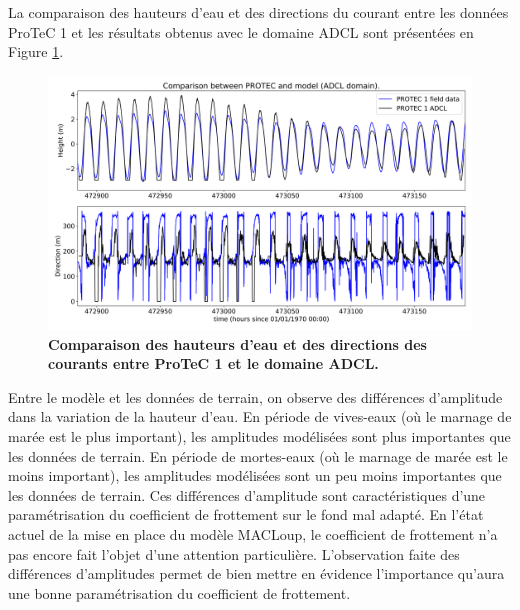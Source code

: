 \documentclass[10pt,a4paper,titlepage]{article}
\begin{document}


La comparaison des hauteurs d'eau et des directions du courant entre les données ProTeC 1 et les résultats obtenus avec le domaine ADCL sont présentées en Figure \ref{fig:comp_brute_ADCL_PROTEC}.

\begin{figure}[h!]
	\centering
	\includegraphics[scale=0.35]{../images/post_traitement/Speed_ADCL_PROTEC1.png}
	\caption{
		\textbf{Comparaison des hauteurs d'eau et des directions des courants entre ProTeC 1 et le domaine ADCL.}}
	\label{fig:comp_brute_ADCL_PROTEC}
\end{figure}

Entre le modèle et les données de terrain, on observe des différences d'amplitude dans la variation de la hauteur d'eau.
En période de vives-eaux (où le marnage de marée est le plus important), les amplitudes modélisées sont plus importantes que les données de terrain.
En période de mortes-eaux (où le marnage de marée est le moins important), les amplitudes modélisées sont un peu moins importantes que les données de terrain.
Ces différences d'amplitude sont caractéristiques d'une paramétrisation du coefficient de frottement sur le fond mal adapté.
En l'état actuel de la mise en place du modèle MACLoup, le coefficient de frottement n'a pas encore fait l'objet d'une attention particulière. %
L'observation faite des différences d'amplitudes permet de bien mettre en évidence l'importance qu'aura une bonne paramétrisation du coefficient de frottement.
\end{document}
